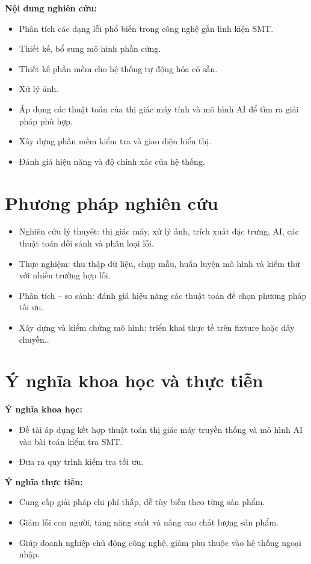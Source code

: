 \textbf{Nội dung nghiên cứu:}
\begin{itemize}
    \item Phân tích các dạng lỗi phổ biến trong công nghệ gắn linh kiện SMT.
    \item Thiết kế, bổ sung mô hình phần cứng.
    \item Thiết kế phần mềm cho hệ thống tự động hóa có sẵn.
    \item Xử lý ảnh.
    \item Áp dụng các thuật toán của thị giác máy tính và mô hình AI để tìm ra giải pháp phù hợp.
    \item Xây dựng phần mềm kiểm tra và giao diện hiển thị.
    \item Đánh giá hiệu năng và độ chính xác của hệ thống.
\end{itemize}

\section*{Phương pháp nghiên cứu}
\begin{itemize}
    \item Nghiên cứu lý thuyết: thị giác máy, xử lý ảnh, trích xuất đặc trưng, AI, các thuật toán đối sánh và phân loại lỗi.
    \item Thực nghiệm: thu thập dữ liệu, chụp mẫu, huấn luyện mô hình và kiểm thử với nhiều trường hợp lỗi.
    \item Phân tích – so sánh: đánh giá hiệu năng các thuật toán để chọn phương pháp tối ưu.
    \item Xây dựng và kiểm chứng mô hình: triển khai thực tế trên fixture hoặc dây chuyền..
\end{itemize}

\section*{Ý nghĩa khoa học và thực tiễn}
\textbf{Ý nghĩa khoa học:}
\begin{itemize}
    \item Đề tài áp dụng kết hợp thuật toán thị giác máy truyền thống và mô hình AI vào bài toán kiểm tra SMT.
    \item Đưa ra quy trình kiểm tra tối ưu.
\end{itemize}

\textbf{Ý nghĩa thực tiễn:}
\begin{itemize}
    \item Cung cấp giải pháp chi phí thấp, dễ tùy biến theo từng sản phẩm.
    \item Giảm lỗi con người, tăng năng suất và nâng cao chất lượng sản phẩm.
    \item Giúp doanh nghiệp chủ động công nghệ, giảm phụ thuộc vào hệ thống ngoại nhập.
\end{itemize}
